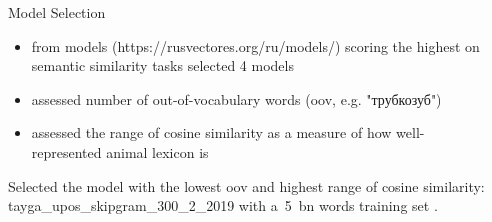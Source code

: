 \documentclass[xcolor=table]{beamer}
\newlength{\sepwidth}
\newcommand{\separatorcolumn}{\begin{column}{\sepwidth}\end{column}}
\begin{document}
\begin{frame}[t]
\begin{columns}[t]
\begin{column}{0.55\paperwidth}
  \begin{block}{Model Selection}
  \begin{itemize}
      \item from models (https://rusvectores.org/ru/models/) scoring the highest  on semantic similarity tasks selected 4 models
      \item assessed number of out-of-vocabulary words (oov, e.g. "трубкозуб")
      \item assessed the range of cosine similarity as a measure of how well-represented animal lexicon is
  \end{itemize}
    Selected the model with the lowest oov and highest range of cosine similarity: tayga\_upos\_skipgram\_300\_2\_2019 with a~5~bn words training set \cite{KutuzovKuzmenko2017}.
  \end{block}
\end{column}
\separatorcolumn
\end{columns}

\begin{columns}[t]
    \separatorcolumn
    \setlength\arrayrulewidth{1pt}


\end{columns}
\end{frame}
\end{document}

